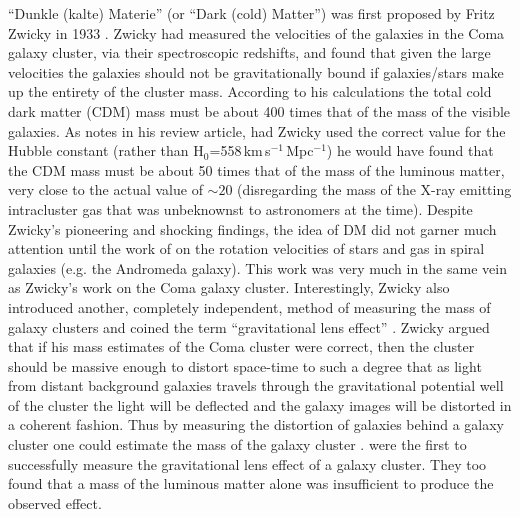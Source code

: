 ``Dunkle (kalte) Materie'' (or ``Dark (cold) Matter'') was first proposed by Fritz Zwicky in 1933 \citep{Zwicky:1933ub}.
Zwicky had measured the velocities of the galaxies in the Coma galaxy cluster, via their spectroscopic redshifts, and found that given the large velocities the galaxies should not be gravitationally bound if galaxies/stars make up the entirety of the cluster mass.
According to his calculations the total cold dark matter (CDM) mass must be about 400 times that of the mass of the visible galaxies. 
As \citet{vandenBergh:1999jf} notes in his review article, had Zwicky used the correct value for the Hubble constant (rather than H$_0$=558\,km\,s$^{-1}$\,Mpc$^{-1}$) he would have found that the CDM mass must be about 50 times that of the mass of the luminous matter, very close to the actual value of $\sim20$ (disregarding the mass of the X-ray emitting intracluster gas that was unbeknownst to astronomers at the time).
Despite Zwicky's pioneering and shocking findings, the idea of DM did not garner much attention until the work of \citet{Rubin:1970gu} on the rotation velocities of stars and gas in spiral galaxies (e.g. the Andromeda galaxy).
This work was very much in the same vein as Zwicky's work on the Coma galaxy cluster. 
Interestingly, Zwicky also introduced another, completely independent, method of measuring the mass of galaxy clusters and coined the term ``gravitational lens effect'' \citep{Zwicky:1937ec}.
Zwicky argued that if his mass estimates of the Coma cluster were correct, then the cluster should be massive enough to distort space-time to such a degree that as light from distant background galaxies travels through the gravitational potential well of the cluster the light will be deflected and the galaxy images will be distorted in a coherent fashion.
Thus by measuring the distortion of galaxies behind a galaxy cluster one could estimate the mass of the galaxy cluster \citep[see Chapter 2 of][for an introduction to weak gravitational lensing]{Courbin:2002wh}.
\citet{Tyson:1990bc} were the first to successfully measure the gravitational lens effect of a galaxy cluster.
They too found that a mass of the luminous matter alone was insufficient to produce the observed effect.

